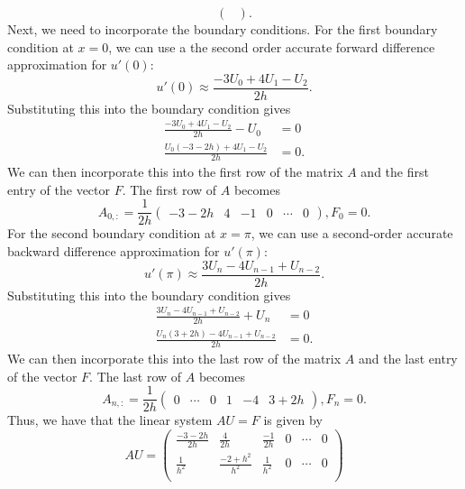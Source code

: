 \documentclass{article}
\begin{document}
\begin{enumerate}[(a)]
\begin{equation*}
\begin{pmatrix}
    \end{pmatrix}.
  \end{equation*}
  Next, we need to incorporate the boundary conditions. For the first boundary condition at $x=0$, we can use a the second order accurate forward difference approximation for $u'(0)$:
  \begin{equation*}
    u'(0) \approx \frac{-3U_0 + 4U_1 - U_2}{2h}.
  \end{equation*}
  Substituting this into the boundary condition gives
  \begin{align*}
    \frac{-3U_0 + 4U_1 - U_2}{2h} - U_0 &= 0 \\
    \frac{U_0(-3-2h) + 4U_1 - U_2}{2h} &= 0.
  \end{align*}
  We can then incorporate this into the first row of the matrix $A$ and the first entry of the vector $F$. The first row of $A$ becomes
  \begin{equation*}
    A_{0,:} = \frac{1}{2h}\begin{pmatrix}
      -3 - 2h & 4 & -1 & 0 & \cdots & 0
    \end{pmatrix},
    F_0 = 0.
  \end{equation*}
  For the second boundary condition at $x=\pi$, we can use a second-order accurate backward difference approximation for $u'(\pi)$:
  \begin{equation*}
    u'(\pi) \approx \frac{3U_n - 4U_{n-1} + U_{n-2}}{2h}.
  \end{equation*}
  Substituting this into the boundary condition gives
  \begin{align*}
    \frac{3U_n - 4U_{n-1} + U_{n-2}}{2h} + U_n &= 0 \\
    \frac{U_n(3 + 2h) - 4U_{n-1} + U_{n-2}}{2h} &= 0.
  \end{align*}
  We can then incorporate this into the last row of the matrix $A$ and the last entry of the vector $F$. The last row of $A$ becomes
  \begin{equation*}
    A_{n,:} = \frac{1}{2h}\begin{pmatrix}
      0 & \cdots & 0 & 1 & -4 & 3 + 2h
    \end{pmatrix},
    F_n = 0.
  \end{equation*}
  Thus, we have that the linear system $AU = F$ is given by
  \begin{equation*}
    AU = \begin{pmatrix}
      \frac{-3 - 2h}{2h} & \frac{4}{2h} & \frac{-1}{2h} & 0 & \cdots & 0 \\
      \frac{1}{h^2} & \frac{-2 + h^2}{h^2} & \frac{1}{h^2} & 0 & \cdots & 0 \\

\end{pmatrix}
\end{equation*}
\end{enumerate}
\end{document}
